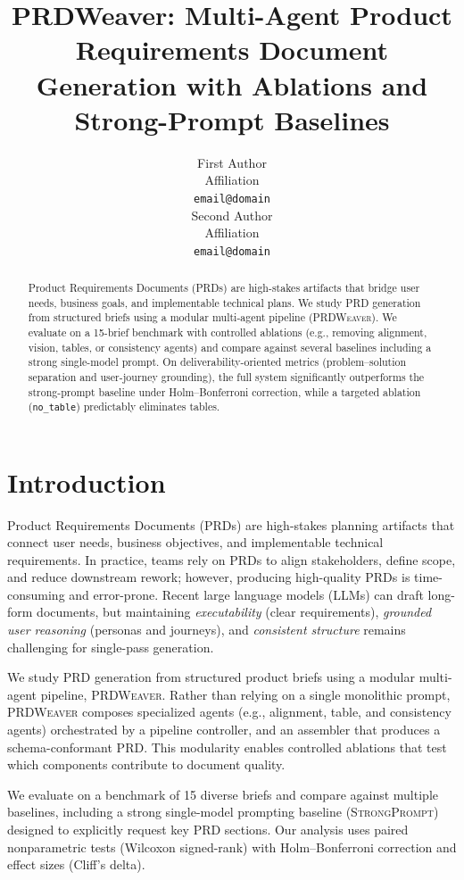 \documentclass[11pt]{article}
\title{PRDWeaver: Multi-Agent Product Requirements Document Generation with Ablations and Strong-Prompt Baselines}
\author{
  First Author \\
  Affiliation \\
  \texttt{email@domain} \\\And
  Second Author \\
  Affiliation \\
  \texttt{email@domain}
}
\begin{document}
\maketitle

\begin{abstract}
Product Requirements Documents (PRDs) are high-stakes artifacts that bridge user needs, business goals, and implementable technical plans.
We study PRD generation from structured briefs using a modular multi-agent pipeline (\textsc{PRDWeaver}).
We evaluate on a 15-brief benchmark with controlled ablations (e.g., removing alignment, vision, tables, or consistency agents) and compare against several baselines including a strong single-model prompt.
On deliverability-oriented metrics (problem--solution separation and user-journey grounding), the full system significantly outperforms the strong-prompt baseline under Holm--Bonferroni correction, while a targeted ablation (\texttt{no\_table}) predictably eliminates tables.
\end{abstract}

\section{Introduction}
\label{sec:intro}

Product Requirements Documents (PRDs) are high-stakes planning artifacts that connect user needs, business objectives, and implementable technical requirements.
In practice, teams rely on PRDs to align stakeholders, define scope, and reduce downstream rework; however, producing high-quality PRDs is time-consuming and error-prone.
Recent large language models (LLMs) can draft long-form documents, but maintaining \emph{executability} (clear requirements), \emph{grounded user reasoning} (personas and journeys), and \emph{consistent structure} remains challenging for single-pass generation.

We study PRD generation from structured product briefs using a modular multi-agent pipeline, \textsc{PRDWeaver}.
Rather than relying on a single monolithic prompt, \textsc{PRDWeaver} composes specialized agents (e.g., alignment, table, and consistency agents) orchestrated by a pipeline controller, and an assembler that produces a schema-conformant PRD.
This modularity enables controlled ablations that test which components contribute to document quality.

We evaluate on a benchmark of 15 diverse briefs and compare against multiple baselines, including a strong single-model prompting baseline (\textsc{StrongPrompt}) designed to explicitly request key PRD sections.
Our analysis uses paired nonparametric tests (Wilcoxon signed-rank) with Holm--Bonferroni correction and effect sizes (Cliff's delta).
\end{document}

